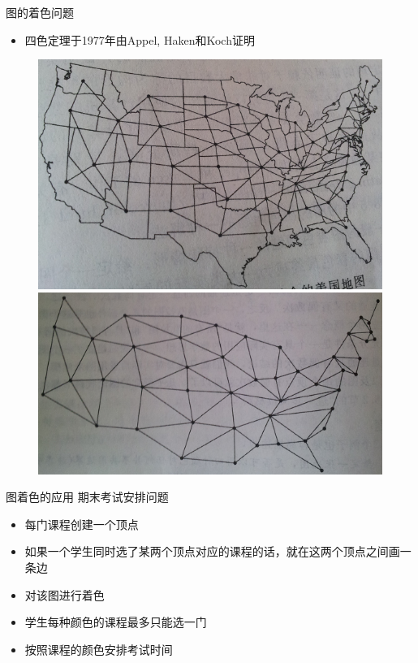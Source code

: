 \documentclass[UTF8]{ctexbeamer}
\begin{document}
\begin{frame}{图的着色问题}
  \begin{itemize}
  \item 四色定理于1977年由Appel, Haken和Koch证明
  \end{itemize}
  \begin{figure}
    \centering
    \includegraphics[height=.35\textheight{}]{map_graph2.png}
    \includegraphics[height=.35\textheight{}]{map_graph.png}
  \end{figure}
  
\end{frame}

\begin{frame}{图着色的应用}
  期末考试安排问题
  \begin{itemize}
  \item 每门课程创建一个顶点
  \item 如果一个学生同时选了某两个顶点对应的课程的话，就在这两个顶点之间画一条边
  \item 对该图进行着色
  \item 学生每种颜色的课程最多只能选一门
  \item 按照课程的颜色安排考试时间
  \end{itemize}
\end{frame}
\end{document}
